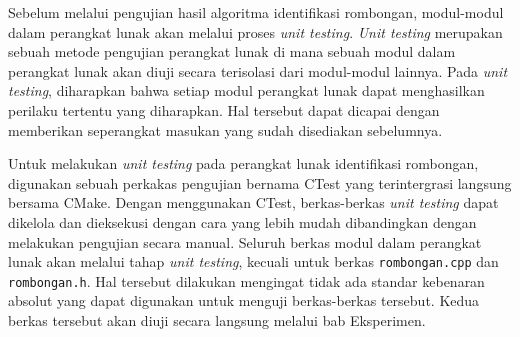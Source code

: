 Sebelum melalui pengujian hasil algoritma identifikasi rombongan, modul-modul dalam perangkat lunak akan melalui proses \textit{unit testing}. \textit{Unit testing} merupakan sebuah metode pengujian perangkat lunak di mana sebuah modul dalam perangkat lunak akan diuji secara terisolasi dari modul-modul lainnya. Pada \textit{unit testing}, diharapkan bahwa setiap modul perangkat lunak dapat menghasilkan perilaku tertentu yang diharapkan. Hal tersebut dapat dicapai dengan memberikan seperangkat masukan yang sudah disediakan sebelumnya.

Untuk melakukan \textit{unit testing} pada perangkat lunak identifikasi rombongan, digunakan sebuah perkakas pengujian bernama CTest yang terintergrasi langsung bersama CMake. Dengan menggunakan CTest, berkas-berkas \textit{unit testing} dapat dikelola dan dieksekusi dengan cara yang lebih mudah dibandingkan dengan melakukan pengujian secara manual. Seluruh berkas modul dalam perangkat lunak akan melalui tahap \textit{unit testing}, kecuali untuk berkas \texttt{rombongan.cpp} dan \texttt{rombongan.h}. Hal tersebut dilakukan mengingat tidak ada standar kebenaran absolut yang dapat digunakan untuk menguji berkas-berkas tersebut. Kedua berkas tersebut akan diuji secara langsung melalui bab Eksperimen.